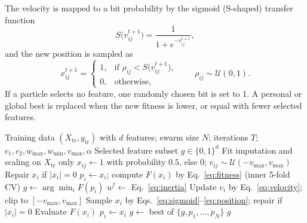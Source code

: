 The velocity is mapped to a bit probability by the sigmoid (S-shaped)
transfer function
\begin{equation}
S\bigl(v_{ij}^{t+1}\bigr) = \frac{1}{1 + e^{-v_{ij}^{t+1}}},
\label{eq:sigmoid}
\end{equation}
and the new position is sampled as
\begin{equation}
x_{ij}^{t+1} =
\begin{cases}
1, & \text{if } \rho_{ij} < S\bigl(v_{ij}^{t+1}\bigr),\\
0, & \text{otherwise},
\end{cases}
\qquad \rho_{ij} \sim \mathcal{U}(0,1).
\label{eq:position}
\end{equation}
If a particle selects no feature, one randomly chosen bit is set to 1.
A personal or global best is replaced when the new fitness is lower, or equal
with fewer selected features.


\begin{algorithm}[!t]
\caption{BPSO feature selection inside one outer training fold}
\label{alg:bpso}
\begin{algorithmic}[1]
\Require Training data $(X_{\text{tr}}, y_{\text{tr}})$ with $d$ features; swarm size $N$;
  iterations $T$; $c_1, c_2, w_{\max}, w_{\min}, v_{\max}, \alpha$
\Ensure Selected feature subset $g \in \{0,1\}^d$
\State Fit imputation and scaling on $X_{\text{tr}}$ only
  \State $x_{ij} \gets 1$ with probability $0.5$, else $0$; \quad $v_{ij} \sim \mathcal{U}(-v_{\max}, v_{\max})$
  \State Repair $x_i$ if $|x_i| = 0$
  \State $p_i \gets x_i$; \quad compute $F(x_i)$ by Eq.~\eqref{eq:fitness} (inner 5-fold CV)
\EndFor
\State $g \gets \arg\min_i F(p_i)$ 
  \State $w^t \gets$ Eq.~\eqref{eq:inertia}
    \State Update $v_i$ by Eq.~\eqref{eq:velocity}; clip to $[-v_{\max}, v_{\max}]$
    \State Sample $x_i$ by Eqs.~\eqref{eq:sigmoid}--\eqref{eq:position}; repair if $|x_i| = 0$
    \State Evaluate $F(x_i)$ 
      \State $p_i \gets x_i$
    \EndIf
  \EndFor
  \State $g \gets$ best of $\{g, p_1, \ldots, p_N\}$
\EndFor
\State \Return $g$
\end{algorithmic}
\end{algorithm}
